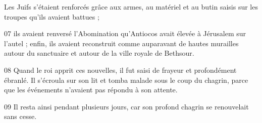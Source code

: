Les Juifs s’étaient renforcés grâce aux armes, au matériel et au butin saisis sur les troupes qu’ils avaient battues ;

07 ils avaient renversé l’Abomination qu’Antiocos avait élevée à Jérusalem sur l’autel ; enfin, ils avaient reconstruit comme auparavant de hautes murailles autour du sanctuaire et autour de la ville royale de Bethsour.

08 Quand le roi apprit ces nouvelles, il fut saisi de frayeur et profondément ébranlé. Il s’écroula sur son lit et tomba malade sous le coup du chagrin, parce que les événements n’avaient pas répondu à son attente.

09 Il resta ainsi pendant plusieurs jours, car son profond chagrin se renouvelait sans cesse. 
